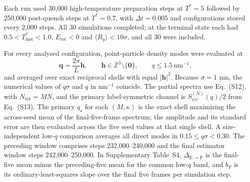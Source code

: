 \documentclass[pdflatex,sn-nature,onecolumn]{sn-jnl}
\begin{document}
Each run used 30,000 high-temperature preparation steps at $T^*=5$ followed by 250,000 post-quench steps at $T^*=0.7$, with $\Delta t=0.005$ and configurations stored every 2,000 steps. All 30 simulations completed; at the terminal state each had $0.5<T^*_{\mathrm{inst}}<1.0$, $E_{\mathrm{tot}}<0$ and $\langle R_g\rangle<10\sigma$, and all 30 were included.

For every analysed configuration, point-particle density modes were evaluated at
\begin{equation}
\bm q=\frac{2\pi}{L}\bm h,\qquad
\bm h\in\mathbb Z^3\setminus\{\bm0\},\qquad q\le1.5\,\mathrm{nm}^{-1},
\tag{S19}
\end{equation}
and averaged over exact reciprocal shells with equal $|\bm h|^2$. Because $\sigma=1$ nm, the numerical values of $q\sigma$ and $q$ in nm$^{-1}$ coincide. The partial spectra use Eq.~(S12), with $N_{\mathrm{tot}}=MN$, and the primary label-symmetric channel is $S_{\psi\psi}^{(N)}(q)/2$ from Eq.~(S13).
The primary $q_\star$ for each $(M,\kappa)$ is the exact shell maximizing the across-seed mean of the final-five-frame spectrum; the amplitude and its standard error are then evaluated across the five seed values at that single shell. A size-independent low-$q$ comparison averages all direct modes in $0.15\le q\sigma<0.30$. The preceding window comprises steps 232,000--240,000 and the final estimator window steps 242,000--250,000. In Supplementary Table~S4, $\Delta_{\mathrm{E}\to\mathrm{F}}$ is the final-five mean minus the preceding-five mean for the common low-$q$ band, and $b_F$ is its ordinary-least-squares slope over the final five frames per simulation step.
\end{document}
